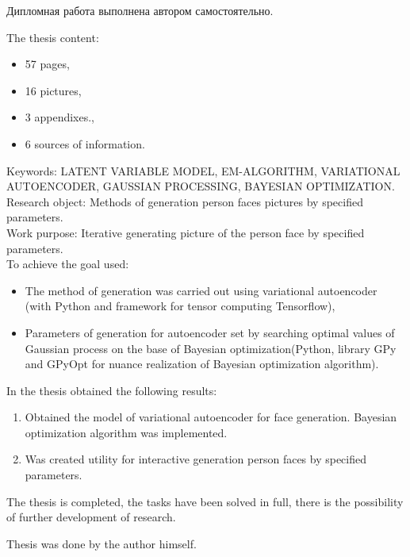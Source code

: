 Дипломная работа выполнена автором самостоятельно.

\newpage

The thesis content:
\begin{itemize}
	\setlength{\itemindent}{2em}
	\setlength\itemsep{0.1em}
	\item 57 pages,
	\item 16 pictures,
	\item 3 appendixes.,
	\item 6 sources of information.
\end{itemize}

\indent
Keywords: LATENT VARIABLE MODEL, EM-ALGORITHM, VARIATIONAL AUTOENCODER, GAUSSIAN PROCESSING, BAYESIAN OPTIMIZATION. \\
\indent
Research object: Methods of generation person faces pictures by specified parameters. \\
\indent
Work purpose: Iterative generating picture of the person face by specified parameters. \\
\indent
To achieve the goal used:
\begin{itemize}
	\setlength{\itemindent}{2em}
	\setlength\itemsep{0.1em}
	\item The method of generation  was carried out using variational autoencoder (with Python and framework for tensor computing Tensorflow),
	\item Parameters of generation for autoencoder set by searching optimal values of Gaussian process on the base of Bayesian optimization(Python, library GPy and GPyOpt for nuance realization of Bayesian optimization algorithm).
\end{itemize}

\indent
In the thesis obtained the following results:
\begin{enumerate}
	\setlength{\itemindent}{2em}
	\setlength\itemsep{0.1em}
	\item Obtained the model of variational autoencoder for face generation. Bayesian optimization algorithm was implemented.
	\item Was created utility for interactive generation person faces by specified parameters.
\end{enumerate}

The thesis is completed, the tasks have been solved in full, there is the possibility of further development of research.

Thesis was done by the author himself.